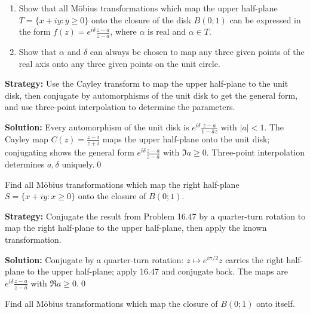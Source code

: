 \begin{problembox}
\begin{enumerate}[label=(\alph*)]
\item Show that all Möbius transformations which map the upper half-plane \( T = \{ x + i y : y \geq 0 \} \) onto the closure of the disk \( B(0; 1) \) can be expressed in the form \( f(z) = e^{i \delta} \frac{z - a}{z - \bar{a}} \), where \( \alpha \) is real and \( \alpha \in T \).
\item Show that \( \alpha \) and \( \delta \) can always be chosen to map any three given points of the real axis onto any three given points on the unit circle.
\end{enumerate}
\end{problembox}

\noindent\textbf{Strategy:} Use the Cayley transform to map the upper half-plane to the unit disk, then conjugate by automorphisms of the unit disk to get the general form, and use three-point interpolation to determine the parameters.

\bigskip\noindent\textbf{Solution:}
Every automorphism of the unit disk is $e^{i\delta}\frac{z-a}{1-\bar a z}$ with $|a|<1$. The Cayley map $C(z)=\frac{z-i}{z+i}$ maps the upper half-plane onto the unit disk; conjugating shows the general form $e^{i\delta}\frac{z-a}{z-\bar a}$ with $\Im a\ge0$. Three-point interpolation determines $a,\delta$ uniquely.\qed


\begin{problembox}
Find all Möbius transformations which map the right half-plane \( S = \{ x + i y : x \geq 0 \} \) onto the closure of \( B(0; 1) \).
\end{problembox}

\noindent\textbf{Strategy:} Conjugate the result from Problem 16.47 by a quarter-turn rotation to map the right half-plane to the upper half-plane, then apply the known transformation.

\bigskip\noindent\textbf{Solution:}
Conjugate by a quarter-turn rotation: $z\mapsto e^{i\pi/2}z$ carries the right half-plane to the upper half-plane; apply 16.47 and conjugate back. The maps are $e^{i\delta}\frac{z-a}{z-\bar a}$ with $\Re a\ge0$.\qed


\begin{problembox}
Find all Möbius transformations which map the closure of \( B(0; 1) \) onto itself.
\end{problembox}

